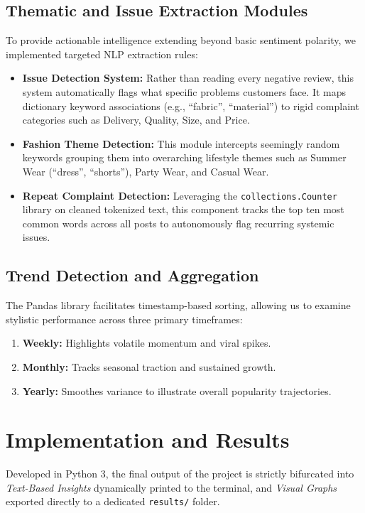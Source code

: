 \documentclass[conference]{IEEEtran}
\begin{document}
\subsection{Thematic and Issue Extraction Modules}
To provide actionable intelligence extending beyond basic sentiment polarity, we implemented targeted NLP extraction rules:
\begin{itemize}
    \item \textbf{Issue Detection System:} Rather than reading every negative review, this system automatically flags what specific problems customers face. It maps dictionary keyword associations (e.g., ``fabric'', ``material'') to rigid complaint categories such as Delivery, Quality, Size, and Price.
    \item \textbf{Fashion Theme Detection:} This module intercepts seemingly random keywords grouping them into overarching lifestyle themes such as Summer Wear (``dress'', ``shorts''), Party Wear, and Casual Wear.
    \item \textbf{Repeat Complaint Detection:} Leveraging the \texttt{collections.Counter} library on cleaned tokenized text, this component tracks the top ten most common words across all posts to autonomously flag recurring systemic issues.
\end{itemize}

\subsection{Trend Detection and Aggregation}
The Pandas library facilitates timestamp-based sorting, allowing us to examine stylistic performance across three primary timeframes:
\begin{enumerate}
    \item \textbf{Weekly:} Highlights volatile momentum and viral spikes.
    \item \textbf{Monthly:} Tracks seasonal traction and sustained growth.
    \item \textbf{Yearly:} Smoothes variance to illustrate overall popularity trajectories.
\end{enumerate}

\section{Implementation and Results}
\label{sec:results}
Developed in Python 3, the final output of the project is strictly bifurcated into \textit{Text-Based Insights} dynamically printed to the terminal, and \textit{Visual Graphs} exported directly to a dedicated \texttt{results/} folder.
\end{document}
